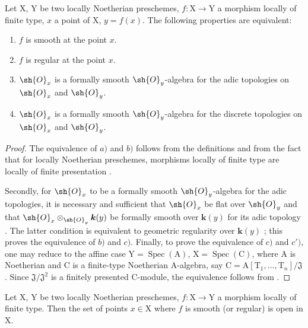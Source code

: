 \begin{theorem}[6.8.6]
\label{IV.6.8.6}
Let $\mathrm{X}$, $\mathrm{Y}$ be two locally Noetherian preschemes, $f:\mathrm{X}\to\mathrm{Y}$ a morphism locally of finite type, $x$ a point of $\mathrm{X}$, $y=f(x)$. The following properties are equivalent:
\begin{enumerate}[label=\emph{\alph*)}]
  \item $f$ is smooth at the point $x$.
  \item $f$ is regular at the point $x$.
  \item $\sh{O}_x$ is a formally smooth $\sh{O}_y$-algebra  for the adic topologies on $\sh{O}_x$ and $\sh{O}_y$.
  \item[\emph{c$'$)}] $\sh{O}_x$ is a formally smooth $\sh{O}_y$-algebra  for the discrete topologies on $\sh{O}_x$ and $\sh{O}_y$.
\end{enumerate}
\end{theorem}

\begin{proof}
The equivalence of $a)$ and $b)$ follows from the definitions  and from the fact that for locally Noetherian preschemes, morphisms locally of finite type are locally of finite presentation .

Secondly, for $\sh{O}_x$ to be a formally smooth $\sh{O}_y$-algebra for the adic topologies, it is necessary and sufficient that $\sh{O}_x$ be flat over $\sh{O}_y$ and that $\sh{O}_x\otimes_{\sh{O}_y}\boldsymbol{k}(y)$ be formally smooth over $\boldsymbol{k}(y)$ for its adic topology . The latter condition is equivalent to geometric regularity over $\boldsymbol{k}(y)$ ; this proves the equivalence of $b)$ and $c)$. Finally, to prove the equivalence of $c)$ and $c')$, one may reduce to the affine case $\mathrm{Y}=\operatorname{Spec}(\mathrm{A})$, $\mathrm{X}=\operatorname{Spec}(\mathrm{C})$, where $\mathrm{A}$ is Noetherian and $\mathrm{C}$ is a finite-type Noetherian $\mathrm{A}$-algebra, say $\mathrm{C}=\mathrm{A}[\mathrm{T}_1,\ldots,\mathrm{T}_n]/\mathfrak{J}$. Since $\mathfrak{J}/\mathfrak{J}^2$ is a finitely presented $\mathrm{C}$-module, the equivalence follows from .
\end{proof}

\begin{corollary}[6.8.7]
\label{IV.6.8.7}
Let $\mathrm{X}$, $\mathrm{Y}$ be two locally Noetherian preschemes, $f:\mathrm{X}\to\mathrm{Y}$ a morphism locally of finite type. Then the set of points $x\in\mathrm{X}$ where $f$ is smooth \textnormal{(}or regular\textnormal{)} is open in $\mathrm{X}$.
\end{corollary}

